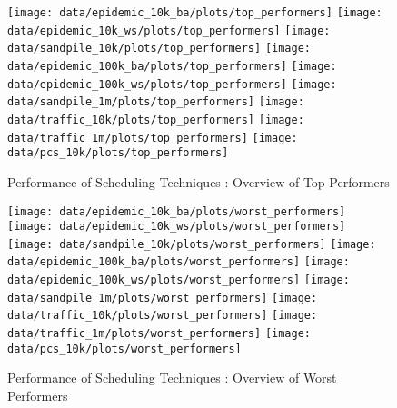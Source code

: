 \documentclass[12pt]{article}
\begin{document}
\begin{figure}
    \texttt{[image: data/epidemic\_10k\_ba/plots/top\_performers]}\quad
    \texttt{[image: data/epidemic\_10k\_ws/plots/top\_performers]}\quad
    \texttt{[image: data/sandpile\_10k/plots/top\_performers]}
    \medskip
    \texttt{[image: data/epidemic\_100k\_ba/plots/top\_performers]}\quad
    \texttt{[image: data/epidemic\_100k\_ws/plots/top\_performers]}\quad
    \texttt{[image: data/sandpile\_1m/plots/top\_performers]}
    \medskip
    \texttt{[image: data/traffic\_10k/plots/top\_performers]}\quad
    \texttt{[image: data/traffic\_1m/plots/top\_performers]}\quad
    \texttt{[image: data/pcs\_10k/plots/top\_performers]}
    \caption*{Performance of Scheduling Techniques : Overview of Top Performers}
\end{figure}

\newpage

\begin{figure}
    \texttt{[image: data/epidemic\_10k\_ba/plots/worst\_performers]}\quad
    \texttt{[image: data/epidemic\_10k\_ws/plots/worst\_performers]}\quad
    \texttt{[image: data/sandpile\_10k/plots/worst\_performers]}
    \medskip
    \texttt{[image: data/epidemic\_100k\_ba/plots/worst\_performers]}\quad
    \texttt{[image: data/epidemic\_100k\_ws/plots/worst\_performers]}\quad
    \texttt{[image: data/sandpile\_1m/plots/worst\_performers]}
    \medskip
    \texttt{[image: data/traffic\_10k/plots/worst\_performers]}\quad
    \texttt{[image: data/traffic\_1m/plots/worst\_performers]}\quad
    \texttt{[image: data/pcs\_10k/plots/worst\_performers]}
    \caption*{Performance of Scheduling Techniques : Overview of Worst Performers}
\end{figure}
\end{document}
